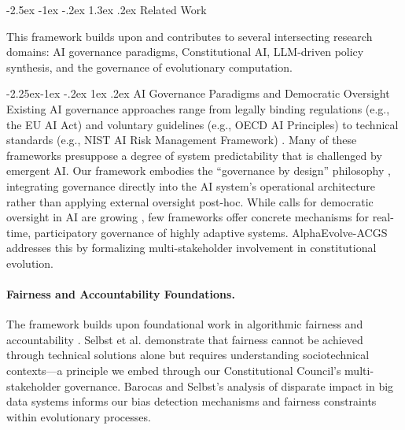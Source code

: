 \documentclass[manuscript,screen,9pt]{acmart}
\makeatletter
\renewcommand\section{\@startsection{section}{1}{\z@}%
  {-2.5ex \@plus -1ex \@minus -.2ex}%
  {1.3ex \@plus.2ex}%
  {\normalfont\Large\bfseries}}
\renewcommand\subsection{\@startsection{subsection}{2}{\z@}%
  {-2.25ex\@plus -1ex \@minus -.2ex}%
  {1ex \@plus .2ex}%
  {\normalfont\large\bfseries}}
\makeatother
\begin{document}
\FloatBarrier %
\section{Related Work}
\label{sec:related_work}

This framework builds upon and contributes to several intersecting research domains: AI governance paradigms, Constitutional AI, LLM-driven policy synthesis, and the governance of evolutionary computation.

\subsection{AI Governance Paradigms and Democratic Oversight}
Existing AI governance approaches range from legally binding regulations (e.g., the EU AI Act) and voluntary guidelines (e.g., OECD AI Principles) to technical standards (e.g., NIST AI Risk Management Framework) \cite{Wynants2025ETHICAL, WorldBank2024AIGovernance, CambridgeUP2024CorporateGovernance}. Many of these frameworks presuppose a degree of system predictability that is challenged by emergent AI. Our framework embodies the ``governance by design'' philosophy \cite{Engin2025AdaptiveAIGovernance}, integrating governance directly into the AI system's operational architecture rather than applying external oversight post-hoc. While calls for democratic oversight in AI are growing \cite{Hwang2025PublicCAI}, few frameworks offer concrete mechanisms for real-time, participatory governance of highly adaptive systems. AlphaEvolve-ACGS addresses this by formalizing multi-stakeholder involvement in constitutional evolution.

\paragraph{Fairness and Accountability Foundations.} The framework builds upon foundational work in algorithmic fairness and accountability \cite{Selbst2019FairnessAccountability, Barocas2016BigDataDisparate}. Selbst et al. demonstrate that fairness cannot be achieved through technical solutions alone but requires understanding sociotechnical contexts---a principle we embed through our Constitutional Council's multi-stakeholder governance. Barocas and Selbst's analysis of disparate impact in big data systems informs our bias detection mechanisms and fairness constraints within evolutionary processes.
\end{document}
